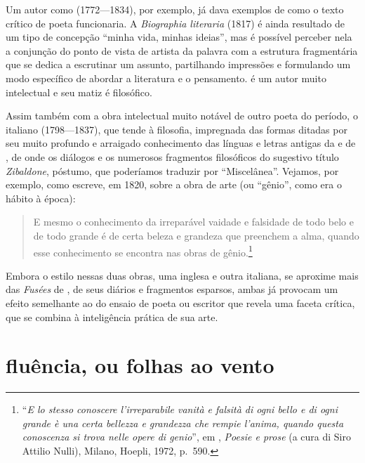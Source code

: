 Um autor como  (1772---1834), por exemplo, já
dava exemplos de como o texto crítico de poeta funcionaria. A
\textit{Biographia literaria} (1817) é ainda resultado de um tipo de
concepção “minha vida, minhas ideias”, mas é possível perceber nela a
conjunção do ponto de vista de artista da palavra com a estrutura
fragmentária que se dedica a escrutinar um assunto, partilhando
impressões e formulando um modo específico de abordar a literatura e o
pensamento.  é um autor muito intelectual e seu matiz é
filosófico.

Assim também com a obra intelectual muito notável de outro poeta
do período, o italiano  (1798---1837), que tende à
filosofia, impregnada das formas ditadas por seu muito profundo e
arraigado conhecimento das línguas e letras antigas da  e de
, de onde os diálogos e os numerosos fragmentos filosóficos do
sugestivo título \textit{Zibaldone}, póstumo, que poderíamos traduzir
por “Miscelânea”. Vejamos, por exemplo, como escreve, em 1820, sobre a
obra de arte (ou “gênio”, como era o hábito à época):

\begin{quote}
E mesmo o conhecimento da irreparável vaidade e falsidade de todo belo e de todo
grande é de certa beleza e grandeza que preenchem a alma, quando
esse conhecimento se encontra nas obras de gênio.\footnote{ ``\textit{E 
lo stesso conoscere l’irreparabile vanità e falsità di ogni bello e di
ogni grande è una certa bellezza e grandezza che rempie l’anima, quando
questa conoscenza si trova nelle opere di genio}'', em , 
\textit{Poesie e prose} (a cura di Siro Attilio Nulli), Milano, Hoepli, 1972, p.~590.}           
\end{quote}

Embora o estilo nessas duas obras, uma inglesa e outra italiana, se
aproxime mais das \textit{Fusées} de , de seus diários e
fragmentos esparsos, ambas já provocam um efeito semelhante ao do
ensaio de poeta ou escritor que revela uma faceta crítica, que se
combina à inteligência prática de sua arte.

\section{fluência, ou folhas ao vento}

